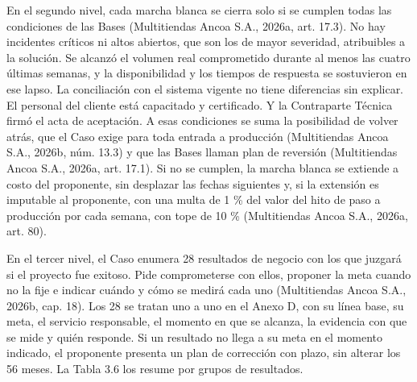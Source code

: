 \documentclass[11pt]{article}
\begin{document}
En el segundo nivel, cada marcha blanca se cierra solo si se cumplen todas las condiciones de las Bases (Multitiendas Ancoa S.A., 2026a, art. 17.3). No hay incidentes críticos ni altos abiertos, que son los de mayor severidad, atribuibles a la solución. Se alcanzó el volumen real comprometido durante al menos las cuatro últimas semanas, y la disponibilidad y los tiempos de respuesta se sostuvieron en ese lapso. La conciliación con el sistema vigente no tiene diferencias sin explicar. El personal del cliente está capacitado y certificado. Y la Contraparte Técnica firmó el acta de aceptación. A esas condiciones se suma la posibilidad de volver atrás, que el Caso exige para toda entrada a producción (Multitiendas Ancoa S.A., 2026b, núm. 13.3) y que las Bases llaman plan de reversión (Multitiendas Ancoa S.A., 2026a, art. 17.1). Si no se cumplen, la marcha blanca se extiende a costo del proponente, sin desplazar las fechas siguientes y, si la extensión es imputable al proponente, con una multa de 1 \% del valor del hito de paso a producción por cada semana, con tope de 10 \% (Multitiendas Ancoa S.A., 2026a, art. 80).

En el tercer nivel, el Caso enumera 28 resultados de negocio con los que juzgará si el proyecto fue exitoso. Pide comprometerse con ellos, proponer la meta cuando no la fije e indicar cuándo y cómo se medirá cada uno (Multitiendas Ancoa S.A., 2026b, cap. 18). Los 28 se tratan uno a uno en el Anexo D, con su línea base, su meta, el servicio responsable, el momento en que se alcanza, la evidencia con que se mide y quién responde. Si un resultado no llega a su meta en el momento indicado, el proponente presenta un plan de corrección con plazo, sin alterar los 56 meses. La Tabla 3.6 los resume por grupos de resultados.
\end{document}
